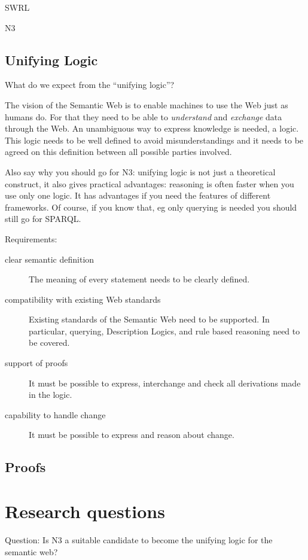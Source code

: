 SWRL

N3

\cite{N3Logic}

\subsection{Unifying Logic}
What do we expect from the ``unifying logic''?

The vision of the Semantic Web is to enable machines to use the Web just as humans do. For that they need to be able to \emph{understand} and \emph{exchange} data through the Web. 
An unambiguous way to express knowledge is needed, a logic. 
This logic needs to be well defined to avoid misunderstandings and it needs to be agreed on this definition between all possible parties involved.


Also say why you should go for N3: unifying logic is not just a theoretical construct, it also gives practical advantages: reasoning is often faster when you use only one logic.  
It has advantages if you need 
the features of different frameworks. Of course, if you know that, eg only querying is needed you should still go for SPARQL.


Requirements:
\begin{description}
 \item[clear semantic definition] 
The meaning of every statement needs to be clearly defined.
 \item[compatibility with existing Web standards]  Existing standards of the Semantic Web need to be supported. 
 In particular, querying, Description Logics, and rule based reasoning need to be covered.
 \item[support of proofs] It must be possible to express, interchange and check all derivations made in the logic.
 \item[capability to handle change] It must be possible to express and reason about change.
\end{description}
\subsection{Proofs}
\section{Research questions}
Question: Is N3 a suitable candidate to become the unifying logic for the semantic web?

